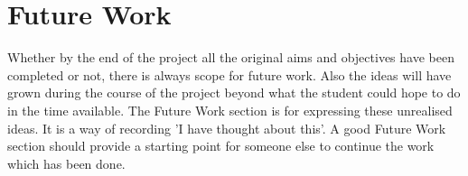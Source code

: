 \section{Future Work}

Whether by the end of the project all the original aims and objectives have been completed or not,
there is always scope for future work. Also the ideas will have grown during the course of the project
beyond what the student could hope to do in the time available. The Future Work section is for
expressing these unrealised ideas. It is a way of recording 'I have thought about this'. A good Future
Work section should provide a starting point for someone else to continue the work which has been
done. 